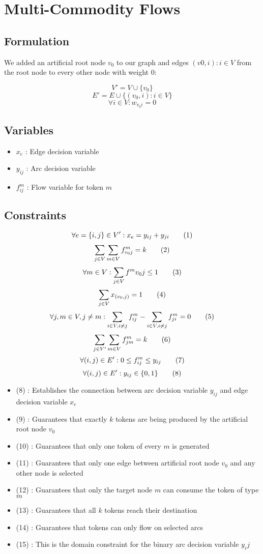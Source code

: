 \section{Multi-Commodity Flows}

\subsection{Formulation}

We added an artificial root node $v_0$ to our graph and edges $(v0,i) : i \in V$  from the root node to every other node with weight $0$:

\[V' = V \cup \{v_0\}\]
\[E' = E \cup \{(v_0,i) : i \in V\}\]
\[\forall i \in V : w_{v_0i} = 0 \]

\subsection{Variables}

\begin{itemize}
	\item $x_{e}$ : Edge decision variable
	\item $y_{ij}$ : Arc decision variable
	\item $f^m_{ij}$ : Flow variable for token $m$
\end{itemize}

\subsection{Constraints}

\[ \forall e = \{i,j\} \in V' : x_e = y_{ij} + y_{ji} \addtag \]
\[ \sum_{j \in V}\sum_{m \in V}f^m_{v_0j} = k \addtag  \]
\[ \forall m \in V : \sum_{j \in V}f^m{v_0j} \leq 1 \addtag \]
\[ \sum_{j \in V}x_{(v_0,j)} = 1 \addtag \]
\[ \forall j,m \in V, j \neq m :  \sum_{i \in V, i \neq j}f^m_{ij} - \sum_{i \in V, i \neq j}f^m_{ji} = 0 \addtag \]
\[ \sum_{j \in V'}\sum_{m \in V}f^m_{jm} = k \addtag  \]
\[ \forall (i,j) \in E' : 0 \leq f^m_{ij} \leq y_{ij} \addtag \]
\[ \forall (i,j) \in E' : y_{ij} \in \{0,1\} \addtag \]

\begin{itemize}
	\item (8) : Establishes the connection between arc decision variable $y_{ij}$ and edge decision variable $x_e$
	\item (9) : Guarantees that exactly $k$ tokens are being produced by the artificial root node $v_0$ 
	\item (10) : Guarantees that only one token of every $m$ is generated
	\item (11) : Guarantees that only one edge between artificial root node $v_0$ and any other node is selected
	\item (12) : Guarantees that only the target node $m$ can consume the token of type $m$
	\item (13) : Guarantees that all $k$ tokens reach their destination
	\item (14) : Guarantees that tokens can only flow on selected arcs
	\item (15) : This is the domain constraint for the binary arc decision variable $y_ij$
\end{itemize}

